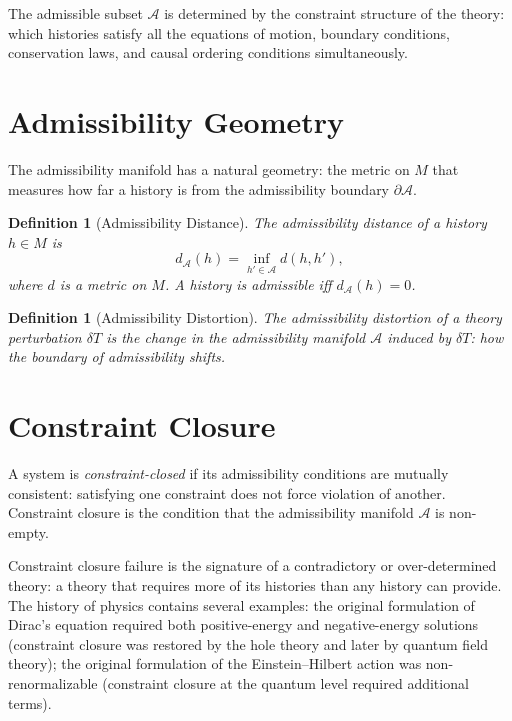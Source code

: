 \documentclass[12pt,a4paper]{book}
\newtheorem{definition}[theorem]{Definition}
\theoremstyle{remark}
\theoremstyle{definition}
\begin{document}
The admissible subset $\mathcal{A}$ is determined by the constraint
structure of the theory: which histories satisfy all the equations of
motion, boundary conditions, conservation laws, and causal ordering
conditions simultaneously.

\section{Admissibility Geometry}

The admissibility manifold has a natural geometry: the metric on $M$
that measures how far a history is from the admissibility boundary
$\partial\mathcal{A}$.

\begin{definition}[Admissibility Distance]
The \emph{admissibility distance} of a history $h \in M$ is
\begin{equation}
  d_{\mathcal{A}}(h) = \inf_{h' \in \mathcal{A}} d(h, h'),
\end{equation}
where $d$ is a metric on $M$. A history is admissible iff
$d_{\mathcal{A}}(h) = 0$.
\end{definition}

\begin{definition}[Admissibility Distortion]
The \emph{admissibility distortion} of a theory perturbation $\delta T$
is the change in the admissibility manifold $\mathcal{A}$ induced by
$\delta T$: how the boundary of admissibility shifts.
\end{definition}

\section{Constraint Closure}

A system is \emph{constraint-closed} if its admissibility conditions
are mutually consistent: satisfying one constraint does not force
violation of another. Constraint closure is the condition that the
admissibility manifold $\mathcal{A}$ is non-empty.

Constraint closure failure is the signature of a contradictory or
over-determined theory: a theory that requires more of its histories
than any history can provide. The history of physics contains several
examples: the original formulation of Dirac's equation required both
positive-energy and negative-energy solutions (constraint closure was
restored by the hole theory and later by quantum field theory); the
original formulation of the Einstein--Hilbert action was
non-renormalizable (constraint closure at the quantum level required
additional terms).
\end{document}
